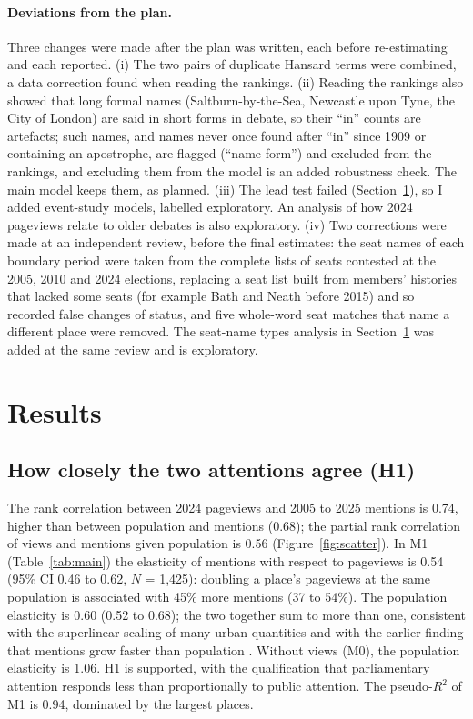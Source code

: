\documentclass[11pt,a4paper]{article}
\begin{document}
\paragraph{Deviations from the plan.} Three changes were made after the plan was written, each before re-estimating and each reported. (i) The two pairs of duplicate Hansard terms were combined, a data correction found when reading the rankings. (ii) Reading the rankings also showed that long formal names (Saltburn-by-the-Sea, Newcastle upon Tyne, the City of London) are said in short forms in debate, so their ``in'' counts are artefacts; such names, and names never once found after ``in'' since 1909 or containing an apostrophe, are flagged (``name form'') and excluded from the rankings, and excluding them from the model is an added robustness check. The main model keeps them, as planned. (iii) The lead test failed (Section~\ref{sec:results}), so I added event-study models, labelled exploratory. An analysis of how 2024 pageviews relate to older debates is also exploratory. (iv) Two corrections were made at an independent review, before the final estimates: the seat names of each boundary period were taken from the complete lists of seats contested at the 2005, 2010 and 2024 elections, replacing a seat list built from members' histories that lacked some seats (for example Bath and Neath before 2015) and so recorded false changes of status, and five whole-word seat matches that name a different place were removed. The seat-name types analysis in Section~\ref{sec:results} was added at the same review and is exploratory.

\section{Results}
\label{sec:results}
\subsection{How closely the two attentions agree (H1)}
The rank correlation between 2024 pageviews and 2005 to 2025 mentions is 0.74, higher than between population and mentions (0.68); the partial rank correlation of views and mentions given population is 0.56 (Figure~\ref{fig:scatter}). In M1 (Table~\ref{tab:main}) the elasticity of mentions with respect to pageviews is 0.54 (95\% CI 0.46 to 0.62, $N$ = 1,425): doubling a place's pageviews at the same population is associated with 45\% more mentions (37 to 54\%). The population elasticity is 0.60 (0.52 to 0.68); the two together sum to more than one, consistent with the superlinear scaling of many urban quantities \citep{Bettencourt2007} and with the earlier finding that mentions grow faster than population \citep{Hotham2026}. Without views (M0), the population elasticity is 1.06. H1 is supported, with the qualification that parliamentary attention responds less than proportionally to public attention. The pseudo-$R^2$ of M1 is 0.94, dominated by the largest places.
\end{document}
